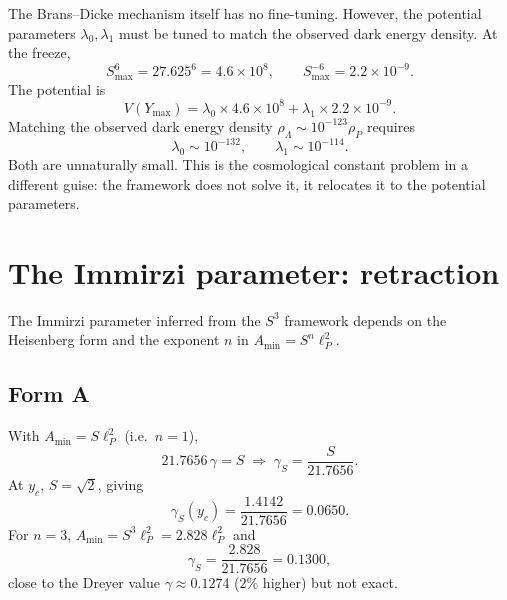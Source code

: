 \documentclass[a4paper,7pt,oneside,openany]{book}
\begin{document}
The Brans--Dicke mechanism itself has no fine-tuning. However, 
the potential parameters $\lambda_{0},\lambda_{1}$ must be tuned 
to match the observed dark energy density. At the freeze,
\begin{equation}
S_{\max}^{6}=27.625^{6}=4.6\times10^{8},
\qquad
S_{\max}^{-6}=2.2\times10^{-9}.
\label{eq:S6}
\end{equation}
The potential is
\begin{equation}
V(Y_{\max})
=
\lambda_{0}\times4.6\times10^{8}
+
\lambda_{1}\times2.2\times10^{-9}.
\label{eq:Vfreeze}
\end{equation}
Matching the observed dark energy density 
$\rho_{\Lambda}\sim10^{-123}\rho_{P}$ requires
\begin{equation}
\lambda_{0}\sim10^{-132},
\qquad
\lambda_{1}\sim10^{-114}.
\label{eq:lambda}
\end{equation}
Both are unnaturally small. This is the cosmological constant 
problem in a different guise: the framework does not solve it, 
it relocates it to the potential parameters.

\section{The Immirzi parameter: retraction}

The Immirzi parameter inferred from the $S^{3}$ framework 
depends on the Heisenberg form and the exponent $n$ in 
$A_{\text{min}}=S^{n}\ell_{P}^{2}$.

\subsection{Form A}

With $A_{\text{min}}=S\ell_{P}^{2}$ (i.e.\ $n=1$),
\begin{equation}
21.7656\,\gamma=S
\;\Longrightarrow\;
\gamma_{S}=\frac{S}{21.7656}.
\label{eq:gamma-A}
\end{equation}
At $y_{c}$, $S=\sqrt{2}$, giving
\begin{equation}
\gamma_{S}(y_{c})
=
\frac{1.4142}{21.7656}
=
0.0650.
\label{eq:gamma-A-yc}
\end{equation}
For $n=3$, $A_{\text{min}}=S^{3}\ell_{P}^{2}=2.828\ell_{P}^{2}$ and
\begin{equation}
\gamma_{S}=\frac{2.828}{21.7656}=0.1300,
\label{eq:gamma-n3}
\end{equation}
close to the Dreyer value $\gamma\approx0.1274$ ($2\%$ higher) 
but not exact.
\end{document}
